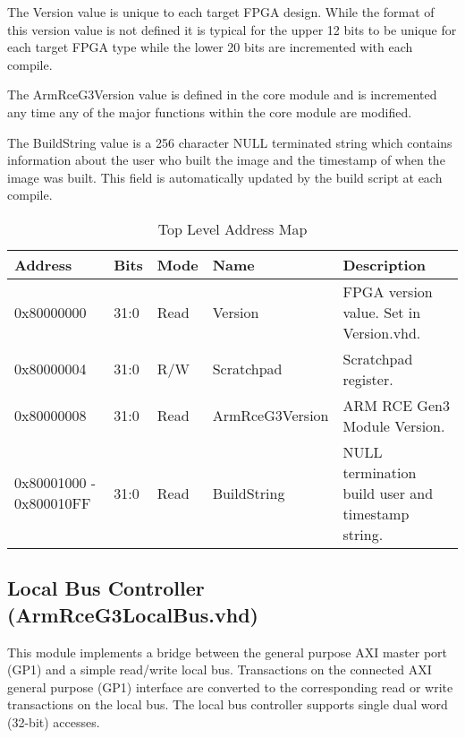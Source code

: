 \documentclass[11pt]{article}
\begin{document}
The Version value is unique to each target FPGA design. While the format of this version value is not defined it is typical for the upper 
12 bits to be unique for each target FPGA type while the lower 20 bits are incremented with each compile.

The ArmRceG3Version value is defined in the core module and is incremented any time any of the major functions within the core module are
modified.

The BuildString value is a 256 character NULL terminated string which contains information about the user who built the image and the 
timestamp of when the image was built. This field is automatically updated by the build script at each compile.

\begin{table}[H]
\small
\centering
   \begin{tabular}{| l | l | l | l | l | } 
      \hline \textbf{Address} & \textbf{Bits} & \textbf{Mode} & \textbf{Name} & \textbf{Description} \\
      \hline 0x80000000       & 31:0          & Read     & Version         & FPGA version value. Set in Version.vhd. \\
      \hline 0x80000004       & 31:0          & R/W      & Scratchpad      & Scratchpad register.                                 \\
      \hline 0x80000008       & 31:0          & Read     & ArmRceG3Version & ARM RCE Gen3 Module Version.                         \\
      \hline 0x80001000 - 0x800010FF & 31:0   & Read     & BuildString     & NULL termination build user and timestamp string.    \\
      \hline
   \end{tabular}
   \caption{Top Level Address Map}
   \label{tab:top_addr}
\end{table}

\subsection{Local Bus Controller (ArmRceG3LocalBus.vhd)}
\label{subsec:ArmRceG3LocalBus}

This module implements a bridge between the general purpose AXI master port (GP1) and a simple read/write local bus. 
Transactions on the connected AXI general purpose (GP1) interface are converted to the corresponding read or write transactions on the local bus. 
The local bus controller supports single dual word (32-bit) accesses.
\end{document}
